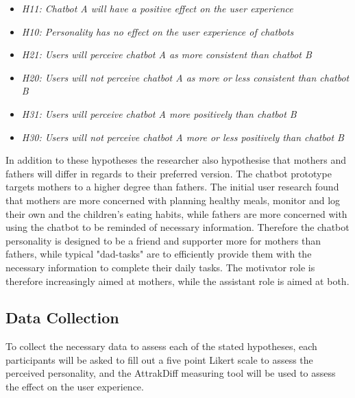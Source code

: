     \begin{itemize}
         \item \textit {H11: Chatbot A will have a positive effect on the user experience}
        \item \textit {H10: Personality has no effect on the user experience of chatbots}
            \vspace{5mm} %

        \item \textit {H21: Users will perceive chatbot A as more consistent than chatbot B}
        \item  \textit {H20: Users will not perceive chatbot A as more or less consistent than chatbot B} 
            \vspace{5mm} %

        \item \textit {H31: Users will perceive chatbot A more positively than chatbot B}
        \item \textit {H30: Users will not perceive chatbot A more or less positively than chatbot B}
    \end{itemize}
    
    In addition to these hypotheses the researcher also hypothesise that mothers and fathers will differ in regards to their preferred version. The chatbot prototype targets mothers to a higher degree than fathers. The initial user research found that mothers are more concerned with planning healthy meals, monitor and log their own and the children's eating habits, while fathers are more concerned with using the chatbot to be reminded of necessary information. Therefore the chatbot personality is designed to be a friend and supporter more for mothers than fathers, while typical "dad-tasks" are to efficiently provide them with the necessary information to complete their daily tasks. The motivator role is therefore increasingly aimed at mothers, while the assistant role is aimed at both.
    
    \vspace{5mm} %
    
    \subsection{Data Collection}
    To collect the necessary data to assess each of the stated hypotheses, each participants will be asked to fill out a five point Likert scale to assess the perceived personality, and the AttrakDiff measuring tool will be used to assess the effect on the user experience.
    
